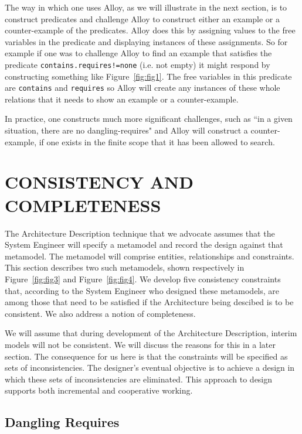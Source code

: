 \documentclass[a4paper,twoside]{article}
\begin{document}
The way in which one uses Alloy, as we will illustrate in the next section, is to construct predicates and challenge Alloy to construct either an example or a counter-example of the predicates. Alloy does this by assigning values to the free variables in the predicate and displaying instances of these assignments. So for example if one was to challenge Alloy to find an example that satisfies the predicate {\small\verb$contains.requires!=none$} (i.e. not empty) it might respond by constructing something like Figure~\ref{fig:fig1}. The free variables in this predicate are {\small\verb$contains$} and {\small\verb$requires$} so Alloy will create any instances of these whole relations that it needs to show an example or a counter-example.

In practice, one constructs much more significant challenges, such as ``in a given situation, there are no dangling-requires" and Alloy will construct a counter-example, if one exists in the finite scope that it has been allowed to search.


\section{\uppercase{Consistency and Completeness}}
\label{sec:consistency}
\noindent The Architecture Description technique that we advocate assumes that the System Engineer will specify a metamodel and record the design against that metamodel. The metamodel will comprise entities, relationships and constraints. This section describes two such metamodels, shown respectively in Figure~\ref{fig:fig3} and Figure~\ref{fig:fig4}. We develop five consistency constraints that, according to the System Engineer who designed these metamodels, are among those that need to be satisfied if the Architecture being descibed is to be consistent. We also address a notion of completeness.

We will assume that during development of the Architecture Description, interim models will not be consistent. We will discuss the reasons for this in a later section. The consequence for us here is that the constraints will be specified as sets of inconsistencies. The designer's eventual objective is to achieve a design in which these sets of inconsistencies are eliminated. This approach to design supports both incremental and cooperative working.


\subsection{Dangling Requires}
\end{document}
